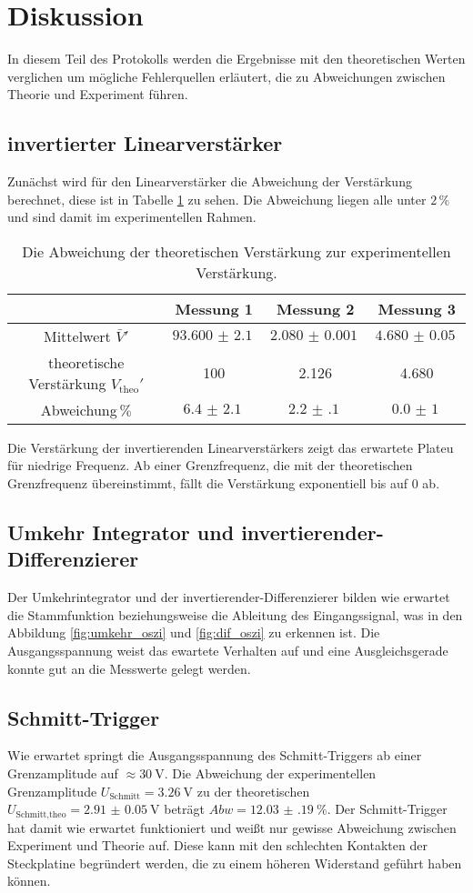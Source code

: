 \section{Diskussion}
\label{sec:diskussion}
In diesem Teil des Protokolls werden die Ergebnisse mit den theoretischen Werten verglichen um mögliche Fehlerquellen erläutert, die zu Abweichungen zwischen Theorie und Experiment führen.
\subsection{invertierter Linearverstärker}
Zunächst wird für den Linearverstärker die Abweichung der Verstärkung berechnet, diese ist in Tabelle \ref{tab:lin_disk} zu sehen.
Die Abweichung liegen alle unter $2\,\%$ und sind damit im experimentellen Rahmen.
\begin{table}
    \centering
    \begin{tabular}{cccc}
        \toprule
        &Messung 1 & Messung 2 & Messung 3\\
        \midrule
        Mittelwert $\bar{V}'$ & $\SI{93.600(2100)}{}$ &  $\SI{2.080(1)}{} $&  $\SI{4.680(50)}{} $ \\
        theoretische Verstärkung $V_\text{theo}'$ & 100 & 2.126 & 4.680 \\
        Abweichung$\,\%$ & $\SI{6.4(21)}{} $& $\SI{2.2(1)}{}$ & $\SI{0.0(10)}{}$ \\
        \bottomrule
    \end{tabular}
    \caption{Die Abweichung der theoretischen Verstärkung zur experimentellen Verstärkung.}
    \label{tab:lin_disk}
\end{table}
Die Verstärkung der invertierenden Linearverstärkers zeigt das erwartete Plateu für niedrige Frequenz.
Ab einer Grenzfrequenz, die mit der theoretischen Grenzfrequenz übereinstimmt, fällt die Verstärkung exponentiell bis auf 0 ab.
\subsection{Umkehr Integrator und invertierender-Differenzierer}
Der Umkehrintegrator und der invertierender-Differenzierer bilden wie erwartet die Stammfunktion beziehungsweise die Ableitung des Eingangssignal, was in den Abbildung \ref{fig:umkehr_oszi} und \ref{fig:dif_oszi} zu erkennen ist.
Die Ausgangsspannung weist das ewartete Verhalten auf und eine Ausgleichsgerade konnte gut an die Messwerte gelegt werden.
\subsection{Schmitt-Trigger}
Wie erwartet springt die Ausgangsspannung des Schmitt-Triggers ab einer Grenzamplitude auf $\approx \SI{30}{\V}$.
Die Abweichung der experimentellen Grenzamplitude $U_\text{Schmitt} = \SI{3.26}{\V}$ zu der theoretischen $U_\text{Schmitt,theo} = \SI{2.91(5)}{\V}$ beträgt $Abw = \SI{12.03(19)}{}\%$.
Der Schmitt-Trigger hat damit wie erwartet funktioniert und weißt nur gewisse Abweichung zwischen Experiment und Theorie auf.
Diese kann mit den schlechten Kontakten der Steckplatine begründert werden, die zu einem höheren Widerstand geführt haben können.
